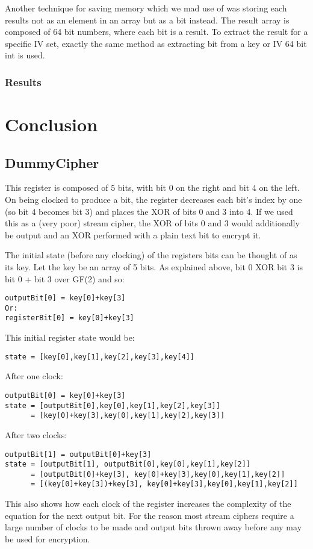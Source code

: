 \documentclass{report}
\let\Oldsubsection\subsection
\renewcommand{\subsection}{\FloatBarrier\Oldsubsection}
\begin{document}
Another technique for saving memory which we mad use of was storing each results not as an element in an array but as a bit instead. The result array is composed of 64 bit numbers, where each bit is a result. To extract the result for a specific IV set, exactly the same method as extracting bit from a key or IV 64 bit int is used.

\subsection{Results}

\chapter{Conclusion}


\begin{appendices}
\chapter{DummyCipher}

This register is composed of 5 bits, with bit 0 on the right and bit 4 on the left. On being clocked to produce a bit, the register decreases each bit's index by one (so bit 4 becomes bit 3) and places the XOR of bits 0 and 3 into 4. If we used this as a (very poor) stream cipher, the XOR of bits 0 and 3 would additionally be output and an XOR performed with a plain text bit to encrypt it.

The initial state (before any clocking) of the registers bits can be thought of as its key. Let the key be an array of 5 bits. As explained above, bit 0 XOR bit 3 is bit 0 + bit 3 over GF(2) and so:
\begin{verbatim}
outputBit[0] = key[0]+key[3]
Or:
registerBit[0] = key[0]+key[3]
\end{verbatim}
This initial register state would be:
\begin{verbatim}
state = [key[0],key[1],key[2],key[3],key[4]]
\end{verbatim}
After one clock:
\begin{verbatim}
outputBit[0] = key[0]+key[3]
state = [outputBit[0],key[0],key[1],key[2],key[3]]
      = [key[0]+key[3],key[0],key[1],key[2],key[3]]
\end{verbatim}
After two clocks:
\begin{verbatim}
outputBit[1] = outputBit[0]+key[3]
state = [outputBit[1], outputBit[0],key[0],key[1],key[2]]
      = [outputBit[0]+key[3], key[0]+key[3],key[0],key[1],key[2]]
      = [(key[0]+key[3])+key[3], key[0]+key[3],key[0],key[1],key[2]]
\end{verbatim}
This also shows how each clock of the register increases the complexity of the equation for the next output bit. For the reason most stream ciphers require a large number of clocks to be made and output bits thrown away before any may be used for encryption.


\end{appendices}
\end{document}
